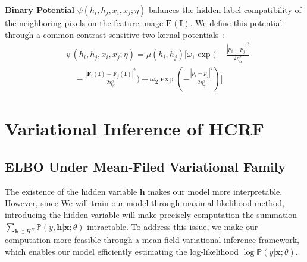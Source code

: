 \documentclass[conference]{IEEEtran}
\newcommand{\PP}{{\mathbb{P}}}
\newcommand{\Fb}{\mathbf{F}}
\newcommand{\Ib}{\mathbf{I}}
\newcommand{\hb}{\mathbf{h}}
\newcommand{\xb}{\mathbf{x}}
\begin{document}
{\textbf{Binary Potential}}
$\psi(h_i, h_j, x_i, x_j; \eta)$
balances the hidden label compatibility of the neighboring pixels on the 
feature image $\Fb(\Ib)$.
We define this potential through a common contrast-sensitive two-kernal 
potentials~\cite{krahenbuhl2011efficient}\cite{chen2022end}:
\begin{equation}
\begin{split}
& \psi(h_i, h_j, x_i, x_j; \eta) = \mu(h_i, h_j) \Bigg[
\omega_1 \exp \bigg(
-\frac{\left\lvert p_i - p_j \right\rvert^2}{2\eta_\alpha^2} \\
&\quad
- \frac{\left\lvert \Fb_i(\Ib) - \Fb_j(\Ib)\right\rvert^2}{2\eta_\beta^2}
\bigg)
+ \omega_2 \exp \left(
- \frac{\left\lvert p_i - p_j \right\rvert^2}{2 \eta_\gamma^2}
\right)
\Bigg]
\end{split}
\end{equation}


\section{Variational Inference of HCRF}


\subsection{ELBO Under Mean-Filed Variational Family}


The existence of the hidden variable $\hb$ makes our model more interpretable.
However, since We will train our model through maximal likelihood method,
introducing the hidden variable will make precisely computation the summation
$\sum_{\hb \in H^N} \PP(y, \hb \vert \xb; \theta)$ intractable.
To address this issue, we make our computation more feasible through a
mean-field variational inference framework, which enables our model
efficiently estimating the log-likelihood $\log\PP(y \vert \xb; \theta)$.
\end{document}
